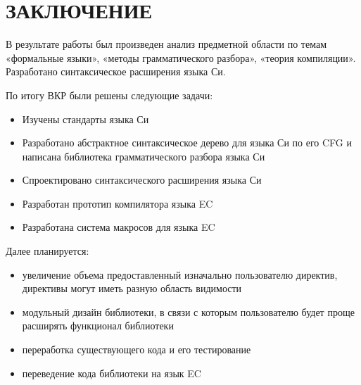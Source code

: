 \chapter*{ЗАКЛЮЧЕНИЕ}                       %

В результате работы был произведен анализ предметной области по темам «формальные языки», «методы грамматического разбора», «теория компиляции».
Разработано синтаксическое расширения языка Си.

По итогу ВКР были решены следующие задачи:
\begin{itemize}
    \item Изучены стандарты\cite{c99_std}\cite{c23_std} языка Си
    \item Разработано абстрактное синтаксическое дерево для языка Си по его CFG и написана библиотека грамматического разбора языка Си
    \item Спроектировано синтаксического расширения языка Си
    \item Разработан прототип компилятора языка EC
    \item Разработана система макросов для языка EC
\end{itemize}

Далее планируется:
\begin{itemize}
    \item увеличение объема предоставленный изначально пользователю директив, директивы могут иметь разную область видимости
    \item модульный дизайн библиотеки, в связи с которым пользователю будет проще расширять функционал библиотеки
    \item переработка существующего кода и его тестирование
    \item переведение кода библиотеки на язык EC
\end{itemize}


